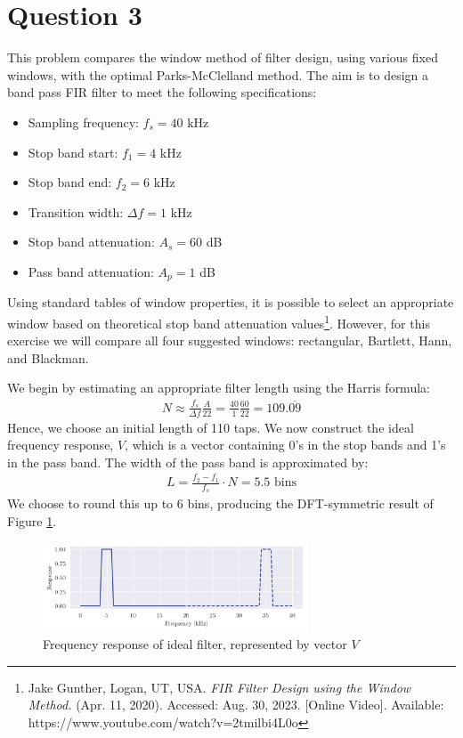 \section*{Question 3}

This problem compares the window method of filter design, using various fixed windows, with the optimal Parks-McClelland method. The aim is to design a band pass FIR filter to meet the following specifications:
\begin{multicols}{2}
    \begin{itemize}
        \item Sampling frequency: $f_s=40$ kHz
        \item Stop band start: $f_1=4$ kHz
        \item Stop band end: $f_2=6$ kHz
        \item Transition width: $\Delta f=1$ kHz
        \item Stop band attenuation: $A_s=60$ dB
        \item Pass band attenuation: $A_p=1$ dB
    \end{itemize}
\end{multicols}
Using standard tables of window properties, it is possible to select an appropriate window based on theoretical stop band attenuation values\footnote{Jake Gunther, Logan, UT, USA. \textit{FIR Filter Design using the Window Method.} (Apr. 11, 2020). Accessed: Aug. 30, 2023. [Online Video]. Available: https://www.youtube.com/watch?v=2tmilbi4L0o}. However, for this exercise we will compare all four suggested windows: rectangular, Bartlett, Hann, and Blackman.

We begin by estimating an appropriate filter length using the Harris formula:
\begin{align}
    N \approx \frac{f_s}{\Delta f} \frac{A}{22} = \frac{40}{1} \frac{60}{22} = 109.\overline{09}
\end{align}
Hence, we choose an initial length of 110 taps. We now construct the ideal frequency response, $V$, which is a vector containing 0's in the stop bands and 1's in the pass band. The width of the pass band is approximated by:
\begin{align}
    L = \frac{f_2 - f_1}{f_s} \cdot N = 5.5 \text{ bins}
\end{align}
We choose to round this up to 6 bins, producing the DFT-symmetric result of Figure \ref{fig:q3_ideal_freqz}.

\begin{figure}[ht]
    \centering
    \includegraphics[width=0.7\textwidth]{images/q3_ideal_freqz.png}
    \caption{Frequency response of ideal filter, represented by vector $V$}
    \label{fig:q3_ideal_freqz}
\end{figure}

